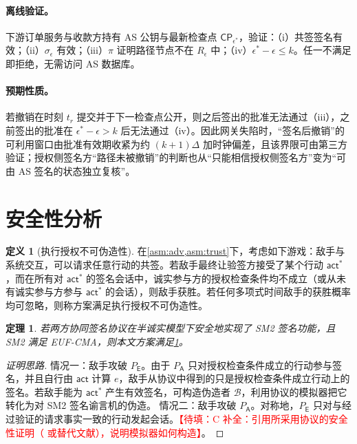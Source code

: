 \documentclass[UTF8,zihao=-4,a4paper]{ctexart}
\newif\ifshowguide
\newcommand{\guide}[1]{%
  \ifshowguide
  \begin{tcolorbox}[colback=gray!8,colframe=gray!45,boxrule=0.4pt,
      arc=1pt,left=4pt,right=4pt,top=2pt,bottom=2pt,fontupper=\small]
  \textbf{写作指引：}#1
  \end{tcolorbox}
  \fi}
\newcommand{\fillme}[1]{\textcolor{red}{【待填：#1】}}
\theoremstyle{plain}
\newtheorem{theorem}{定理}
\theoremstyle{definition}
\newtheorem{definition}{定义}
\theoremstyle{remark}
\newcommand{\Pexec}{P_{\mathsf{E}}}
\newcommand{\Pauth}{P_{\mathsf{A}}}
\newcommand{\act}{\mathsf{act}}
\newcommand{\CP}{\mathsf{CP}}
\begin{document}
\paragraph{离线验证。}下游订单服务与收款方持有 AS 公钥与最新检查点 $\CP_{\epsilon^\ast}$，验证：（i）共签签名有效；（ii）$\sigma_\epsilon$ 有效；（iii）$\pi$ 证明路径节点不在 $R_\epsilon$ 中；（iv）$\epsilon^\ast-\epsilon\le k$。任一不满足即拒绝，无需访问 AS 数据库。

\paragraph{预期性质。}若撤销在时刻 $t_r$ 提交并于下一检查点公开，则之后签出的批准无法通过（iii），之前签出的批准在 $\epsilon^\ast-\epsilon>k$ 后无法通过（iv）。因此网关失陷时，“签名后撤销”的可利用窗口由批准有效期收紧为约 $(k+1)\Delta$ 加时钟偏差，且该界限可由第三方验证；授权侧签名方“路径未被撤销”的判断也从“只能相信授权侧签名方”变为“可由 AS 签名的状态独立复核”。
\guide{写作时保持克制：（1）明确这是设计、无实验数据；（2）说明检查点分发需要验证方能取得最新纪元（如从公开日志拉取），这是新的可用性依赖；（3）说明与 CRL/OCSP 装订/证书透明\cite{rfc5280,rfc6960,rfc6962}的关系：构件成熟，新意在绑定方式与作用对象；（4）可复用项目已有的 SM3 审计检查点基础设施。}

\section{安全性分析}\label{sec:security}

\begin{definition}[执行授权不可伪造性]\label{def:eau}
在\cref{asm:adv,asm:trust}下，考虑如下游戏：敌手与系统交互，可以请求任意行动的共签。若敌手最终让验签方接受了某个行动 $\act^*$，而在所有对 $\act^*$ 的签名会话中，诚实参与方的授权检查条件均不成立（或从未有诚实参与方参与 $\act^*$ 的会话），则敌手获胜。若任何多项式时间敌手的获胜概率均可忽略，则称方案满足执行授权不可伪造性。
\end{definition}

\begin{theorem}\label{thm:main}
若两方协同签名协议在半诚实模型下安全地实现了 SM2 签名功能，且 SM2 满足 EUF-CMA，则本文方案满足\cref{def:eau}。
\end{theorem}

\guide{证明分两种情况写，每种情况都归约到 SM2 的不可伪造性。}
\begin{proof}[证明思路]
情况一：敌手攻破 $\Pexec$。由于 $\Pauth$ 只对授权检查条件成立的行动参与签名，并且自行由 $\act$ 计算 $e$，敌手从协议中得到的只是授权检查条件成立行动上的签名。若敌手能为 $\act^*$ 产生有效签名，可构造伪造者 $\mathcal{B}$，利用协议的模拟器把它转化为对 SM2 签名谕言机的伪造。
情况二：敌手攻破 $\Pauth$。对称地，$\Pexec$ 只对与经过验证的请求事实一致的行动发起会话。\fillme{C 补全：引用所采用协议的安全性证明（\cite{shang2014} 或替代文献），说明模拟器如何构造}。
\end{proof}
\end{document}
